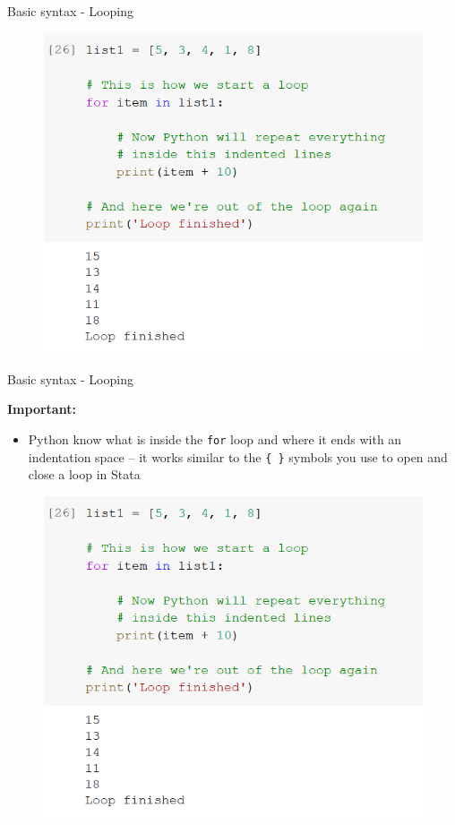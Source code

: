 \documentclass[aspectratio=169]{beamer}
\begin{document}
\begin{frame}{Basic syntax - Looping}

	\begin{figure}
		\centering
		\includegraphics[width=0.6\linewidth]{img/list_loop.png}
	\end{figure}

\end{frame}

\begin{frame}{Basic syntax - Looping}

	\textbf{Important:}

	\begin{multicols}{2}

		\begin{itemize}	
			\item Python know what is inside the \texttt{for} loop and where it ends with an indentation space -- it works similar to the \texttt{\{ \}} symbols you use to open and close a loop in Stata
		\end{itemize}
		\begin{figure}
			\centering
			\includegraphics[width=\linewidth]{img/list_loop.png}
		\end{figure}

	\end{multicols}

\end{frame}
\end{document}
